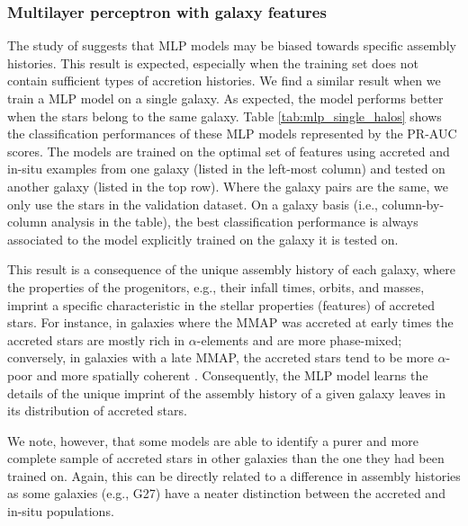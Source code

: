 \subsubsection{Multilayer perceptron with galaxy features}
\label{sec:MLP_galaxyfeatures}

The study of \citet{Tronrud2022} suggests that MLP models may be biased towards specific assembly histories. This result is expected, especially when the training set does not contain sufficient types of accretion histories. We find a similar result when we train a MLP model on a single galaxy. As expected, the model performs better when the stars belong to the same galaxy.
Table \ref{tab:mlp_single_halos} shows the classification performances of these MLP models represented by the PR-AUC scores. The models are trained on the optimal set of features using accreted and in-situ examples from one galaxy (listed in the left-most column) and tested on another galaxy (listed in the top row). Where the galaxy pairs are the same, we only use the stars in the validation dataset.  On a galaxy basis (i.e., column-by-column analysis in the table), the best classification performance is always associated to the model explicitly trained on the galaxy it is tested on.

This result is a consequence of the unique assembly history of each galaxy, where the properties of the progenitors, e.g., their infall times, orbits, and masses, imprint a specific characteristic in the stellar properties (features) of accreted stars. For instance, in galaxies where the MMAP was accreted at early times the accreted stars are mostly rich in $\alpha$-elements and are more phase-mixed; conversely, in galaxies with a late MMAP, the accreted stars tend to be more $\alpha$-poor and more spatially coherent \citep{Font2006a}.
Consequently, the MLP model learns the details of the unique imprint of the assembly history of a given galaxy leaves in its distribution of accreted stars.

We note, however, that some models are able to identify a purer and more complete sample of accreted stars in other galaxies than the one they had been trained on. Again, this can be directly related to a difference in assembly histories as some galaxies (e.g., G27) have a neater distinction between the accreted and in-situ populations.

